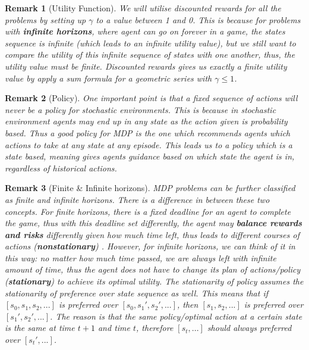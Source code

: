 \documentclass[12pt]{article}
\newtheorem*{remark}{Remark}
\begin{document}
\begin{remark}[Utility Function]
 We will utilise discounted rewards for all the problems by setting up $\gamma$ to a value between 1 and 0. This is because for problems with \textbf{infinite horizons}, where agent can go on forever in a game, the states sequence is infinite (which leads to an infinite utility value), but we still want to compare the utility of this infinite sequence of states with one another, thus, the utility value must be finite. Discounted rewards gives us exactly a finite utility value by apply a sum formula for a geometric series with $\gamma \leq 1$.  
\end{remark}

\begin{remark}[Policy]
One important point is that a fixed sequence of actions will never be a policy for stochastic environments. This is because in stochastic environment agents may end up in any state as the action given is probability based. Thus a good policy for MDP is the one which recommends agents which actions to take at any state at any episode. This leads us to a policy which is a state based, meaning gives agents guidance based on which state the agent is in, regardless of historical actions.
\end{remark}

\begin{remark}[Finite \& Infinite horizons]
MDP problems can be further classified as finite and infinite horizons. There is a difference in between these two concepts. For finite horizons, there is a fixed deadline for an agent to complete the game, thus with this deadline set differently, the agent may \textbf{balance rewards and risks} differently given how much time left, thus leads to different courses of actions (\textbf{nonstationary}) . However, for infinite horizons, we can think of it in this way: no matter how much time passed, we are always left with infinite amount of time, thus the agent does not have to change its plan of actions/policy (\textbf{stationary}) to achieve its optimal utility. The stationarity of policy assumes the stationarity of preference over state sequence as well. This means that if $[s_0, s_1, s_2 , ... ]$ is preferred over $[s_0, s_1', s_2', ...]$, then $[s_1, s_2, ...]$ is preferred over $[s_1', s_2', ...]$. The reason is that the same policy/optimal action at a certain state is the same at time $t+1$ and time $t$, therefore $[s_t, ...]$ should always preferred over $[s_t', ...]$.
\end{remark}
\end{document}
